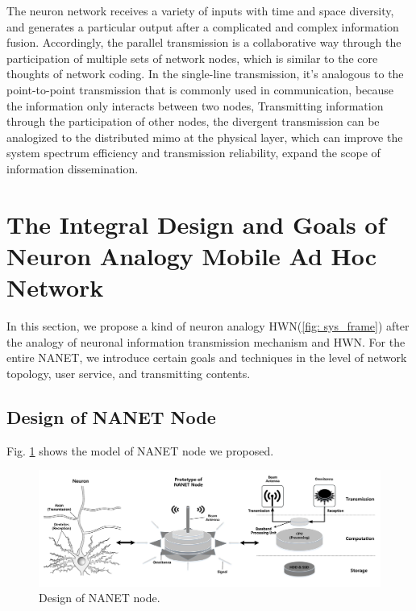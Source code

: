 \documentclass[journal,comsoc]{IEEEtran}
\begin{document}
			The neuron network receives a variety of inputs with time and space diversity, and  generates a particular output after a complicated and complex information fusion.
			Accordingly, the parallel transmission is a collaborative way through the participation of multiple sets of network nodes, which is similar to the core thoughts of network coding.
			In the single-line transmission,  it's analogous to the point-to-point transmission that is commonly used in communication, because the information only interacts between two nodes,
			Transmitting information through the participation of other nodes, the divergent transmission can be analogized to the distributed mimo at the physical layer, which can improve the system spectrum efficiency and transmission reliability, expand the scope of information dissemination.
	
	\section{The Integral Design and Goals of Neuron Analogy Mobile Ad Hoc Network}
	\label{section: general_design}
		In this section, we propose a kind of neuron analogy HWN(\ref{fig: sys_frame})  after the analogy of neuronal information transmission mechanism and HWN.
		For the entire NANET, we introduce certain goals and techniques in the level of network topology, user service, and transmitting contents.
		
		\subsection{Design of NANET Node}
				Fig. \ref{fig: NANET_node} shows the model of NANET node we proposed.
				\begin{figure}[htbp]
					\centering
					\includegraphics[width=0.95\linewidth]{figures/node_model.pdf}
					\caption{Design of NANET node.}	
					\label{fig: NANET_node}
				\end{figure}
		
\end{document}
